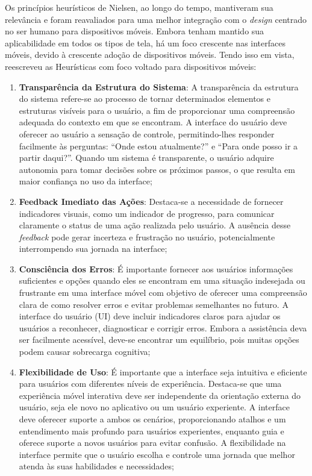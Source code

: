 Os princípios heurísticos de Nielsen, ao longo do tempo, mantiveram sua relevância e foram reavaliados para uma melhor integração com o \textit{design} centrado no ser humano para dispositivos móveis. Embora tenham mantido sua aplicabilidade em todos os tipos de tela, há um foco crescente nas interfaces móveis, devido à crescente adoção de dispositivos móveis. Tendo isso em vista,  reescreveu as Heurísticas com foco voltado para dispositivos móveis:

\begin{enumerate}
    \item \textbf{Transparência da Estrutura do Sistema}: A transparência da estrutura do sistema refere-se ao processo de tornar determinados elementos e estruturas visíveis para o usuário, a fim de proporcionar uma compreensão adequada do contexto em que se encontram. A interface do usuário deve oferecer ao usuário a sensação de controle, permitindo-lhes responder facilmente às perguntas: ``Onde estou atualmente?'' e ``Para onde posso ir a partir daqui?''. Quando um sistema é transparente, o usuário adquire autonomia para tomar decisões sobre os próximos passos, o que resulta em maior confiança no uso da interface;
    \item \textbf{Feedback Imediato das Ações}: Destaca-se a necessidade de fornecer indicadores visuais, como um indicador de progresso, para comunicar claramente o status de uma ação realizada pelo usuário. A ausência desse \textit{feedback} pode gerar incerteza e frustração no usuário, potencialmente interrompendo sua jornada na interface;
    \item \textbf{Consciência dos Erros}: É importante fornecer aos usuários informações suficientes e opções quando eles se encontram em uma situação indesejada ou frustrante em uma interface móvel com objetivo de oferecer uma compreensão clara de como resolver erros e evitar problemas semelhantes no futuro. A interface do usuário (UI) deve incluir indicadores claros para ajudar os usuários a reconhecer, diagnosticar e corrigir erros. Embora a assistência deva ser facilmente acessível, deve-se encontrar um equilíbrio, pois muitas opções podem causar sobrecarga cognitiva;
    \item \textbf{Flexibilidade de Uso}: É importante que a interface seja intuitiva e eficiente para usuários com diferentes níveis de experiência. Destaca-se que uma experiência móvel interativa deve ser independente da orientação externa do usuário, seja ele novo no aplicativo ou um usuário experiente. A interface deve oferecer suporte a ambos os cenários, proporcionando atalhos e um entendimento mais profundo para usuários experientes, enquanto guia e oferece suporte a novos usuários para evitar confusão. A flexibilidade na interface permite que o usuário escolha e controle uma jornada que melhor atenda às suas habilidades e necessidades;

\end{enumerate}
